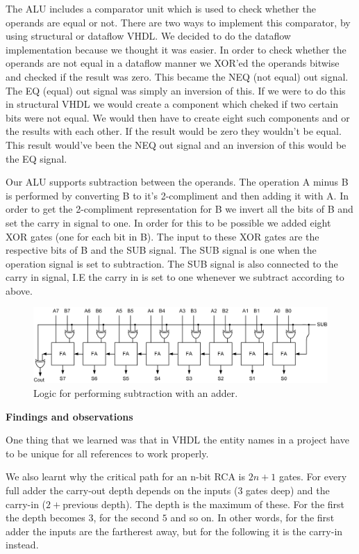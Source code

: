 \documentclass[a4paper,11pt]{article}
\begin{document}
The ALU includes a comparator unit which is used to check whether the operands are equal or not. There are two ways to implement this comparator, by using structural or dataflow VHDL. We decided to do the dataflow implementation because we thought it was easier. In order to check whether the operands are not equal in a dataflow manner we XOR'ed the operands bitwise and checked if the result was zero. This became the NEQ (not equal) out signal. The EQ (equal) out signal was simply an inversion of this. If we were to do this in structural VHDL we would create a component which cheked if two certain bits were not equal. We would then have to create eight such components and or the results with each other. If the result would be zero they wouldn't be equal. This result would've been the NEQ out signal and an inversion of this would be the EQ signal. 

Our ALU supports subtraction between the operands. The operation A minus B is performed by converting B to it's 2-compliment and then adding it with A. In order to get the 2-compliment representation for B we invert all the bits of B and set the carry in signal to one. In order for this to be possible we added eight XOR gates (one for each bit in B). The input to these XOR gates are the respective bits of B and the SUB signal. The SUB signal is one when the operation signal is set to subtraction. The SUB signal is also connected to the carry in signal, I.E the carry in is set to one whenever we subtract according to above.

\begin{figure}[h!]
  \includegraphics[width=\linewidth]{subtractionlogic.jpg}
  \caption{Logic for performing subtraction with an adder.}
  \label{fig:etikett}
\end{figure}

\noindent
\textbf{Findings and observations}

One thing that we learned was that in VHDL the entity names in a project have to be unique for all references to work properly. 

We also learnt why the critical path for an n-bit RCA is $2n+1$ gates. For every full adder the carry-out depth depends on the inputs ($3$ gates deep) and the carry-in ($2 + $previous depth). The depth is the maximum of these. For the first the depth becomes $3$, for the second $5$ and so on. In other words, for the first adder the inputs are the fartherest away, but for the following it is the carry-in instead. \\
\end{document}
